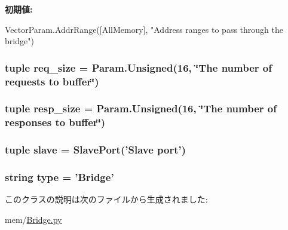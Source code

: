 \label{classBridge_1_1Bridge_abe08d3b07d6b72953260a39c8428ecf5}
{\bfseries 初期値:}
\begin{DoxyCode}
VectorParam.AddrRange([AllMemory],
                                   "Address ranges to pass through the bridge")
\end{DoxyCode}
\hypertarget{classBridge_1_1Bridge_a750557f752c49cbd47651bb4d0798075}{
\subsubsection[{req\_\-size}]{\setlength{\rightskip}{0pt plus 5cm}tuple {\bf req\_\-size} = Param.Unsigned(16, \char`\"{}The number of requests to buffer\char`\"{})}}
\label{classBridge_1_1Bridge_a750557f752c49cbd47651bb4d0798075}
\hypertarget{classBridge_1_1Bridge_adfe2ddbc99cf4426ac41767c4b98258c}{
\subsubsection[{resp\_\-size}]{\setlength{\rightskip}{0pt plus 5cm}tuple {\bf resp\_\-size} = Param.Unsigned(16, \char`\"{}The number of responses to buffer\char`\"{})}}
\label{classBridge_1_1Bridge_adfe2ddbc99cf4426ac41767c4b98258c}
\hypertarget{classBridge_1_1Bridge_a9b8cb1f697e86858437a78f041478c9b}{
\subsubsection[{slave}]{\setlength{\rightskip}{0pt plus 5cm}tuple {\bf slave} = {\bf SlavePort}('Slave port')}}
\label{classBridge_1_1Bridge_a9b8cb1f697e86858437a78f041478c9b}
\hypertarget{classBridge_1_1Bridge_acce15679d830831b0bbe8ebc2a60b2ca}{
\subsubsection[{type}]{\setlength{\rightskip}{0pt plus 5cm}string {\bf type} = '{\bf Bridge}'}}
\label{classBridge_1_1Bridge_acce15679d830831b0bbe8ebc2a60b2ca}


このクラスの説明は次のファイルから生成されました:\begin{DoxyCompactItemize}
\item 
mem/\hyperlink{Bridge_8py}{Bridge.py}\end{DoxyCompactItemize}
